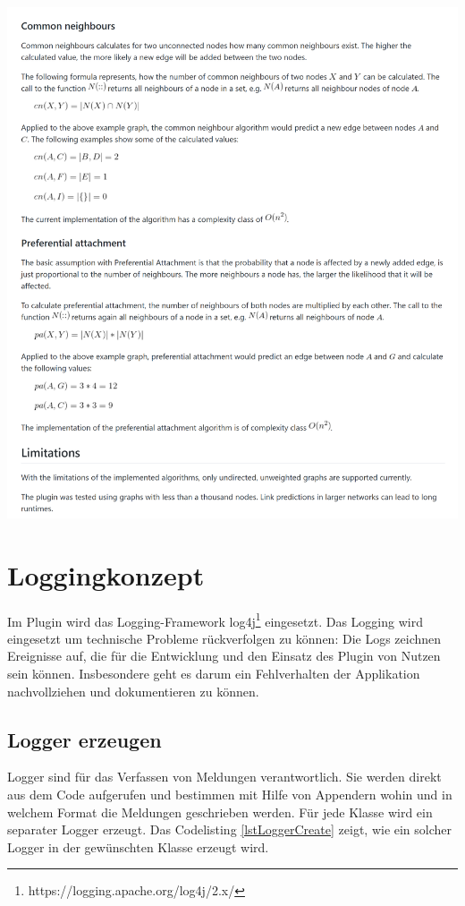 \includegraphics[width=\textwidth]{resources/readme_pt3.png}

\newpage

\section{Loggingkonzept}
\label{loggingkonzept}

Im Plugin wird das Logging-Framework log4j\footnote{https://logging.apache.org/log4j/2.x/} eingesetzt.
Das Logging wird eingesetzt um technische Probleme rückverfolgen zu können: Die Logs zeichnen Ereignisse auf, die für die Entwicklung und den Einsatz des Plugin von Nutzen sein können.
Insbesondere geht es darum ein Fehlverhalten der Applikation nachvollziehen und dokumentieren zu können.

\subsection{Logger erzeugen}
Logger sind für das Verfassen von Meldungen verantwortlich. Sie werden direkt aus dem Code aufgerufen und bestimmen mit Hilfe von Appendern wohin und in welchem Format die Meldungen geschrieben werden.
Für jede Klasse wird ein separater Logger erzeugt. Das Codelisting \ref{lstLoggerCreate} zeigt, wie ein solcher Logger in der gewünschten Klasse erzeugt wird.

